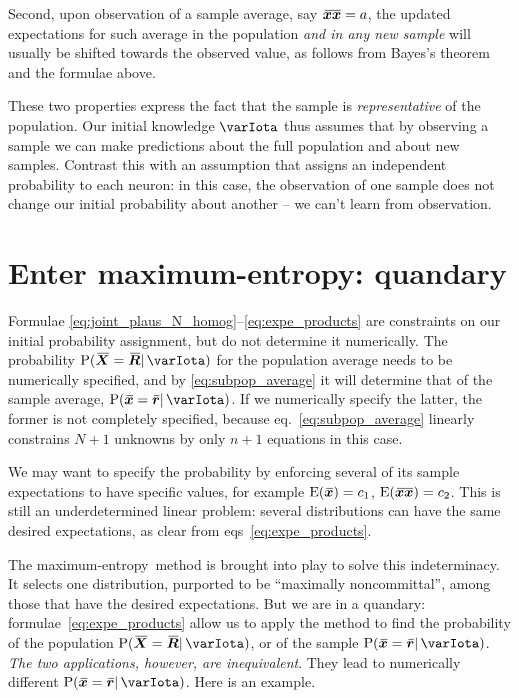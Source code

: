 \documentclass{article}
\theoremstyle{remark}
\theoremstyle{innote}
\renewcommand*{\|}{\mathpunct{|}}%
\newcommand*{\p}{\mathrm{P}}%
\newcommand*{\eqn}{eq.}%
\newcommand*{\eqns}{eqs}%
\newcommand*{\E}{\mathrm{E}}
\DeclarePairedDelimiter\expp{(}{)}
\newcommand*{\expe}{\E\expp}%
\theoremstyle{simple}
\newcommand*{\widebar}[1]{{\mkern1.5mu\skew{2}\overline{\mkern-1.5mu#1\mkern-1.5mu}\mkern 1.5mu}}
\newcommand*{\av}{\widebar} %
\newcommand*{\sav}{\widebar} %
\newcommand*{\yxx}{x}%
\newcommand*{\yx}{\bm{\yxx}}%
\newcommand*{\yxs}{\sav{\yx}}%
\newcommand*{\yX}{\bm{X}}%
\newcommand*{\yXf}{\av{\yX}}%
\newcommand*{\yxxs}{\sav{\yx\yx}}%
\newcommand*{\yr}{\bm{r}}%
\newcommand*{\yrs}{\sav{\yr}}%
\newcommand*{\yR}{\bm{R}}%
\newcommand*{\yRf}{\av{\yR}}%
\newcommand*{\yH}{\varIota}
\newcommand*{\me}{maximum-entropy}
\begin{document}
Second, upon observation of a sample average, say $\yxxs=a$, the updated
expectations for such average in the population \emph{and in any new
  sample} will usually be shifted towards the observed value, as follows
from Bayes's theorem and the formulae above.

These two properties express the fact that the sample is
\emph{representative} of the population. Our initial knowledge $\yH$ thus
assumes that by observing a sample we can make predictions about the full
population and about new samples. Contrast this with an assumption that
assigns an independent probability to each neuron: in this case, the
observation of one sample does not change our initial probability about
another -- we can't learn from observation.

\section{Enter maximum-entropy: quandary}
\label{sec:specific_initial_probability}

Formulae \eqref{eq:joint_plaus_N_homog}--\eqref{eq:expe_products} are
constraints on our initial probability assignment, but do not determine it
numerically. The probability $\p(\yXf=\yRf \| \yH)$ for the population
average needs to be numerically specified, and by \eqref{eq:subpop_average}
it will determine that of the sample average, $\p(\yxs=\yrs \| \yH)$. If we
numerically specify the latter, the former is not completely specified,
because \eqn~\eqref{eq:subpop_average} linearly constrains $N+1$ unknowns
by only $n+1$ equations in this case.

We may want to specify the probability by enforcing several of its sample
expectations to have specific values, for example $\expe{\yxs}=c_1$,
$\expe{\yxxs}=c_2$. This is still an underdetermined linear problem:
 several distributions can have the same desired expectations, as
clear from \eqns~\eqref{eq:expe_products}.

The \me\ method is brought into play to solve this indeterminacy. It selects
one distribution, purported to be \enquote{maximally noncommittal}, among
those that have the desired expectations. But we are in a quandary:
formulae~\eqref{eq:expe_products} allow us to apply the method to find the
probability of the population $\p(\yXf=\yRf \| \yH)$, or of the sample
$\p(\yxs=\yrs \| \yH)$. \emph{The two applications, however, are
  inequivalent}. They lead to numerically different $\p(\yxs=\yrs \| \yH)$.
Here is an example.
\end{document}
